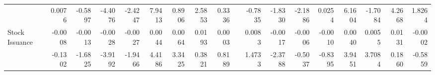 \begin{sidewaystable}[htbp]
{\begin{tabular}{lrrrrrrrrrrrrrrrrr}
& 0.0076 & -0.5897 & -4.4076 & -2.4247 & 7.9413 & 0.8906 & 2.5853 & 0.3336 &       & -0.7835 & -1.8330 & -2.1886 & 0.0254 & 6.1604 & -1.7084 & 4.2668 & 1.8264 \\
Stock Issuance & -0.0008 & -0.0013 & -0.0028 & -0.0027 & 0.0044 & 0.0064 & 0.0193 & 0.0003 &       & 0.0083 & -0.0017 & -0.0006 & -0.0010 & 0.0040 & 0.0055 & 0.0131 & -0.0002 \\
& -0.1302 & -1.6825 & -3.9192 & -1.9466 & 4.4186 & 3.3425 & 0.3821 & 0.8189 &       & 1.4733 & -2.3788 & -0.5037 & -0.8395 & 3.9451 & 3.7084 & 0.1860 & -0.5859 \\
\bottomrule
\end{tabular}%
}
\label{tab:liq-ff6v}%
\end{sidewaystable}%
